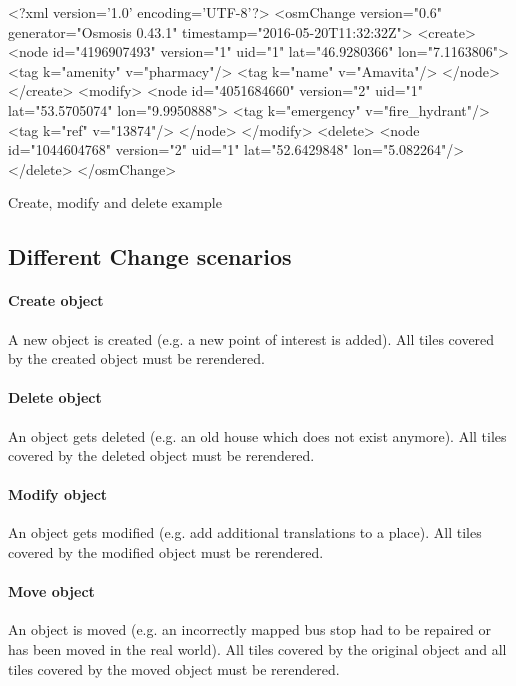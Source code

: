 \begin{listing}[H]
  \centering
  \begin{xmlcode}
<?xml version='1.0' encoding='UTF-8'?>
<osmChange version="0.6" generator="Osmosis 0.43.1" timestamp="2016-05-20T11:32:32Z">
  <create>
    <node id="4196907493" version="1" uid="1" lat="46.9280366" lon="7.1163806">
      <tag k="amenity" v="pharmacy"/>
      <tag k="name" v="Amavita"/>
    </node>
  </create>
  <modify>
    <node id="4051684660" version="2" uid="1" lat="53.5705074" lon="9.9950888">
      <tag k="emergency" v="fire_hydrant"/>
      <tag k="ref" v="13874"/>
    </node>
    </modify>
  <delete>
    <node id="1044604768" version="2" uid="1" lat="52.6429848" lon="5.082264"/>
  </delete>
</osmChange>
  \end{xmlcode}
  \caption{Create, modify and delete example}
  \label{create_modify_delete_xml}
\end{listing}

\subsection{Different Change scenarios}\label{osm_change_scenarios}


\paragraph{Create object} A new object is created (e.g. a new point of interest is added). All tiles covered by the created object must be rerendered.

\paragraph{Delete object} An object gets deleted (e.g. an old house which does not exist anymore). All tiles covered by the deleted object must be rerendered.

\paragraph{Modify object} An object gets modified (e.g. add additional translations to a place). All tiles covered by the modified object must be rerendered.

\paragraph{Move object} An object is moved (e.g. an incorrectly mapped bus stop had to be repaired or has been moved in the real world). All tiles covered by the original object and all tiles covered by the moved object must be rerendered.

